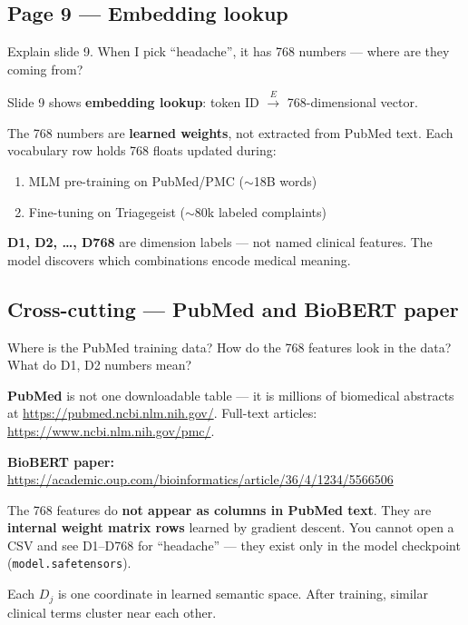 \documentclass[11pt]{article}
\begin{document}
\subsection{Page 9 --- Embedding lookup}

\begin{questionbox}
Explain slide 9. When I pick ``headache'', it has 768 numbers --- where are they coming from?
\end{questionbox}

\begin{answerbox}
Slide 9 shows \textbf{embedding lookup}: token ID $\xrightarrow{E}$ 768-dimensional vector.

The 768 numbers are \textbf{learned weights}, not extracted from PubMed text. Each vocabulary row holds 768 floats updated during:
\begin{enumerate}
  \item MLM pre-training on PubMed/PMC ($\sim$18B words)
  \item Fine-tuning on Triagegeist ($\sim$80k labeled complaints)
\end{enumerate}

\textbf{D1, D2, \ldots, D768} are dimension labels --- not named clinical features. The model discovers which combinations encode medical meaning.
\end{answerbox}

\subsection{Cross-cutting --- PubMed and BioBERT paper}

\begin{questionbox}
Where is the PubMed training data? How do the 768 features look in the data? What do D1, D2 numbers mean?
\end{questionbox}

\begin{answerbox}
\textbf{PubMed} is not one downloadable table --- it is millions of biomedical abstracts at \url{https://pubmed.ncbi.nlm.nih.gov/}. Full-text articles: \url{https://www.ncbi.nlm.nih.gov/pmc/}.

\textbf{BioBERT paper:} \url{https://academic.oup.com/bioinformatics/article/36/4/1234/5566506}

The 768 features do \textbf{not appear as columns in PubMed text}. They are \textbf{internal weight matrix rows} learned by gradient descent. You cannot open a CSV and see D1--D768 for ``headache'' --- they exist only in the model checkpoint (\texttt{model.safetensors}).

Each $D_j$ is one coordinate in learned semantic space. After training, similar clinical terms cluster near each other.
\end{answerbox}
\end{document}
